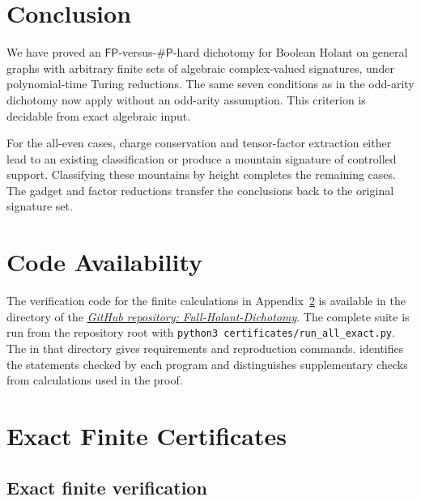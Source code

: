 \documentclass[11pt,letterpaper,onecolumn]{article}
\newcommand{\GitHubIcon}{\mbox{{\small\faGithub}}\nobreakspace}%
\newcommand{\GitHubIcon}{}%
\theoremstyle{plain}
\theoremstyle{definition}
\theoremstyle{remark}
\newcommand{\FP}{\mathsf{FP}}
\newcommand{\SharpP}{\#\mathsf P}
\begin{document}
	
	\section{Conclusion}
	\label{sec:conclusion}
	
	We have proved an \(\FP\)-versus-\(\SharpP\)-hard dichotomy for Boolean
	Holant on general graphs with arbitrary finite sets of algebraic
	complex-valued signatures, under polynomial-time Turing reductions.
	The same seven conditions as in the odd-arity dichotomy now apply without
	an odd-arity assumption. This criterion is decidable from exact algebraic input.
	
	For the all-even cases, charge conservation and tensor-factor extraction
	either lead to an existing classification or produce a mountain signature
	of controlled support. Classifying these mountains by height completes the
	remaining cases. The gadget and factor reductions transfer the conclusions
back to the original signature set.
	
	\section*{Code Availability}
	The verification code for the finite calculations in
	Appendix~\ref{sec:exact-finite-certificates} is available in the
	 directory of the
	\href{https://github.com/liuchliuch/Full-Holant-Dichotomy}%
	{\textcolor{repositorylink}{\GitHubIcon\textit{GitHub repository:
	Full-Holant-Dichotomy}}}. The complete suite is run from the repository
	root with \texttt{python3 certificates/run\_all\_exact.py}.
	The  in that directory gives requirements and reproduction
	commands.  identifies the statements checked
	by each program and distinguishes supplementary checks from calculations
	used in the proof.
	
	
	\clearpage
\appendix
\renewcommand{\thesection}{F.\Alph{section}}
\renewcommand{\theHsection}{fullappendix.\Alph{section}}
	\section{Exact Finite Certificates}
	\label{sec:exact-finite-certificates}

	\subsection{Exact finite verification}
	\label{subsec:certificate-terminology}
	
\end{document}
